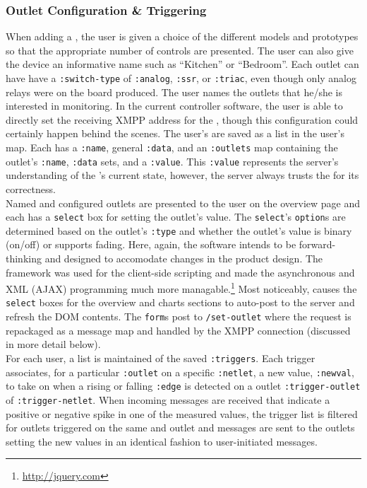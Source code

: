 \subsubsection{Outlet Configuration \& Triggering} 
When adding a \netlet, the user is given a choice of the different models and prototypes so that the appropriate number of controls are presented.  The user can also give the device an informative name such as ``Kitchen'' or ``Bedroom''.  Each outlet can have have a \texttt{:switch-type} of \texttt{:analog}, \texttt{:ssr}, or \texttt{:triac}, even though only analog relays were on the board produced.  The user names the outlets that he/she is interested in monitoring.  In the current controller software, the user is able to directly set the receiving XMPP address for the \netlet, though this configuration could certainly happen behind the scenes. The user's \netlets are saved as a list in the user's map.  Each \netlet has a \texttt{:name}, general \netlet \texttt{:data}, and an \texttt{:outlets} map containing the outlet's \texttt{:name}, \texttt{:data} sets, and a \texttt{:value}.  This \texttt{:value} represents the server's understanding of the \netlet's current state, however, the server always trusts the \netlet for its correctness.\\

Named and configured outlets are presented to the user on the overview page and each has a \texttt{select} box for setting the outlet's value.  The \texttt{select}'s \texttt{option}s are determined based on the outlet's \texttt{:type} and whether the outlet's value is binary (on/off) or supports fading. Here, again, the software intends to be forward-thinking and designed to accomodate changes in the product design. The \jquery \js framework was used for the client-side scripting and made the asynchronous \js and XML (AJAX) programming much more managable.\footnote{\url{http://jquery.com}} Most noticeably, \jquery causes the \texttt{select} boxes for the overview and charts sections to auto-post to the server and refresh the DOM contents. The \texttt{form}s post to \texttt{/set-outlet} where the request is repackaged as a message map and handled by the XMPP connection (discussed in more detail below).\\

For each user, a list is maintained of the saved \texttt{:triggers}.  Each trigger associates, for a particular \texttt{:outlet} on a specific \texttt{:netlet}, a new value, \texttt{:newval}, to take on when a rising or falling \texttt{:edge} is detected on a outlet \texttt{:trigger-outlet} of \netlet \texttt{:trigger-netlet}.   When incoming messages are received that indicate a positive or negative spike in one of the measured values, the trigger list is filtered for outlets triggered on the same \netlet and outlet and messages are sent to the outlets setting the new values in an identical fashion to user-initiated messages.\\


